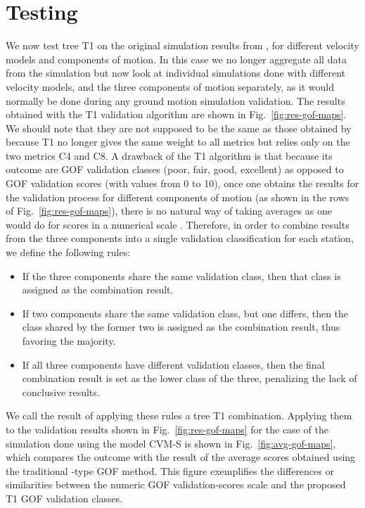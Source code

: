 
\section{Testing}

We now test tree T1 on the original simulation results from \citet{Taborda_2014_BSSA}, for different velocity models and components of motion. In this case we no longer aggregate all data from the simulation but now look at individual simulations done with different velocity models, and the three components of motion separately, as it would normally be done during any ground motion simulation validation. The results obtained with the T1 validation algorithm are shown in Fig.~\ref{fig:res-gof-maps}. We should note that they are not supposed to be the same as those obtained by \citet{Taborda_2014_BSSA} because T1 no longer gives the same weight to all metrics but relies only on the two metrics C4 and C8. A drawback of the T1 algorithm is that because its outcome are GOF validation classes (poor, fair, good, excellent) as opposed to GOF validation scores (with values from 0 to 10), once one obtains the results for the validation process for different components of motion (as shown in the rows of Fig.~\ref{fig:res-gof-maps}), there is no natural way of taking averages as one would do for scores in a numerical scale \citep[i.e., as typically done when using][]{Anderson_2004_Proc}. Therefore, in order to combine results from the three components into a single validation classification for each station, we define the following rules:

\begin{itemize}
	\setlength\itemsep{0ex}
	\item If the three components share the same validation class, then that class is assigned as the combination result.
	\item If two components share the same validation class, but one differs, then the class shared by the former two is assigned as the combination result, thus favoring the majority.
	\item If all three components have different validation classes, then the final combination result is set as the lower class of the three, penalizing the lack of conclusive results.
\end{itemize}

We call the result of applying these rules a tree T1 combination. Applying them to the validation results shown in Fig.~\ref{fig:res-gof-maps} for the case of the simulation done using the model CVM-S is shown in Fig.~\ref{fig:avg-gof-maps}, which compares the outcome with the result of the average scores obtained using the traditional \citet{Anderson_2004_Proc}-type GOF method. This figure exemplifies the differences or similarities between the numeric GOF validation-scores scale and the proposed T1 GOF validation classes.


